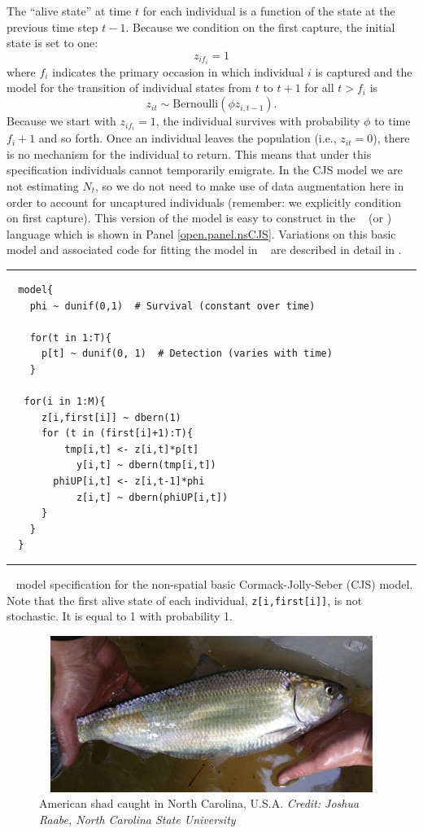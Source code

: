 The ``alive state'' at time $t$ for each individual is a
function of the state at the previous time step $t-1$.   Because
we condition on the first capture, the initial
state is set to one:
\[
 z_{i f_i} = 1
\]
where $f_i$ indicates the primary occasion in which individual $i$ is
captured and the model for the transition of individual states from $t$ to $t+1$ for
all $t > f_i$ is
\[
 z_{i t} \sim \mbox{Bernoulli}( \phi z_{i,t-1}).
\]
Because we start with $z_{i f_i} = 1$, the individual survives with
probability $\phi$ to time $f_i + 1$ and so forth.  Once an individual
leaves the population (i.e., $z_{it} = 0$), there is no mechanism for
the individual to return.  This means that under this specification
individuals cannot temporarily emigrate.  In the CJS model we are not
estimating $N_t$, so we do not need to make use of data augmentation
here in order to account for uncaptured individuals (remember: we
explicitly condition on first capture).  This version of the model is
easy to construct in the \bugs~ (or \jags) language which is shown in
Panel \ref{open.panel.nsCJS}.  Variations on this basic model and
associated code for fitting the model in \bugs~ are described in
detail in \citet[][Chapts. 7-9]{kery_schaub:2011}.

\begin{panel}[htp]
\centering
\rule[0.1in]{\textwidth}{.03in}
{\small
\begin{verbatim}
  model{
    phi ~ dunif(0,1)  # Survival (constant over time)
    
    for(t in 1:T){
      p[t] ~ dunif(0, 1)  # Detection (varies with time)
    }

   for(i in 1:M){
      z[i,first[i]] ~ dbern(1)
      for (t in (first[i]+1):T){
          tmp[i,t] <- z[i,t]*p[t]
            y[i,t] ~ dbern(tmp[i,t])
        phiUP[i,t] <- z[i,t-1]*phi
            z[i,t] ~ dbern(phiUP[i,t])
      }
    }
  }
\end{verbatim}
}
\rule[-0.1in]{\textwidth}{.03in}
\caption{
\jags~ model specification for the non-spatial basic
Cormack-Jolly-Seber (CJS) model. Note that the first alive state of
each individual, \mbox{\tt z[i,first[i]]}, is not stochastic. It is
equal to 1 with probability 1.}
\label{open.panel.nsCJS}
\end{panel}


\begin{figure}
\centering
\includegraphics[height=2in,width=4.43in]{Ch16-Open/figs/American_Shad_Raabe.jpg}
\caption{American shad caught in North Carolina, U.S.A.  {\it
Credit: Joshua Raabe, North Carolina State University}  
}
\label{open.figs.shadpic}
\end{figure}

